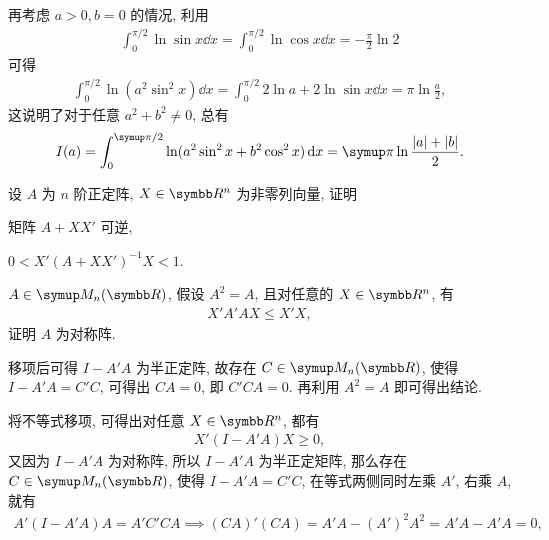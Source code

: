 \documentclass{ctexart}
\begin{document}
\begin{exercise}[resume=exer]
\begin{answer}
            再考虑 $ a > 0, b = 0 $ 的情况, 利用
            \begin{align*}
                \int_{0}^{\pi/2} \ln\sin x\dd{x} = \int_{0}^{\pi/2} \ln\cos x\dd{x} = -\frac{\pi}{2} \ln 2
            \end{align*}
            可得
            \begin{align*}
                \int_{0}^{\pi/2} \ln(a^{2}\sin^{2}x) \dd{x} = \int_{0}^{\pi/2} 2\ln a + 2\ln \sin x\dd{x} = \pi\ln\frac{a}{2}, 
            \end{align*}
            这说明了对于任意 $ a^{2} + b^{2} \ne 0 $, 总有
            \begin{align*}
                I(a) = \int_{0}^{\pi/2} \ln (a^{2}\sin^{2}x + b^{2}\cos^{2}x) \dd{x} = \pi\ln\frac{\abs{a} + \abs{b}}{2}.
            \end{align*} 
        \end{answer}
        \item 设 $ A $ 为 $ n $ 阶正定阵, $ X \in \R^{n} $ 为非零列向量, 证明
        \begin{exercise}
            \item 矩阵 $ A + XX' $ 可逆,
            \item $ 0 < X'(A + XX')^{-1}X < 1 $. 
        \end{exercise}
        \item $ A\in \MM $, 假设 $ A^{2} = A $, 且对任意的 $ X \in \R^{n} $, 有
        \begin{align*}
            X'A'AX \le X'X,
        \end{align*}
        证明 $ A $ 为对称阵.
        \begin{hint}
            移项后可得 $ I - A'A $ 为半正定阵, 故存在 $ C \in \MM $, 使得 $ I - A'A = C'C $, 可得出 $ CA = 0 $, 即 $ C'CA = 0 $. 再利用 $ A^{2} = A $ 即可得出结论.
        \end{hint}
        \begin{answer}
            将不等式移项, 可得出对任意 $ X \in \R^{n} $, 都有
            \begin{align*}
                X'(I - A'A)X \ge 0,
            \end{align*}
            又因为 $ I - A'A $ 为对称阵, 所以 $ I - A'A $ 为半正定矩阵, 那么存在 $ C \in \MM $, 使得 $ I - A'A = C'C $, 在等式两侧同时左乘 $ A' $, 右乘 $ A $, 就有
            \begin{align*}
                A'(I - A'A)A = A'C'CA \implies (CA)'(CA) = A'A - (A')^{2}A^{2} = A'A - A'A = 0,
            \end{align*}

\end{answer}
\end{exercise}
\end{document}
